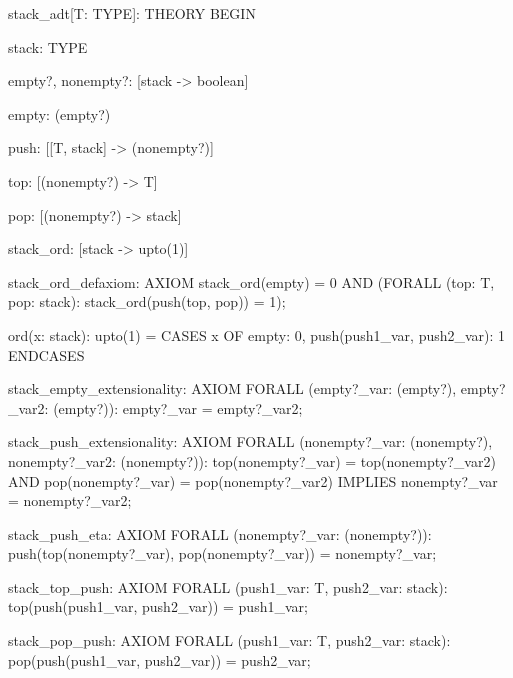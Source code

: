 stack_adt[T: TYPE]: THEORY
 BEGIN

  stack: TYPE

  empty?, nonempty?: [stack -> boolean]

  empty: (empty?)

  push: [[T, stack] -> (nonempty?)]

  top: [(nonempty?) -> T]

  pop: [(nonempty?) -> stack]

  stack_ord: [stack -> upto(1)]

  stack_ord_defaxiom: AXIOM
    stack_ord(empty) = 0 AND
     (FORALL (top: T, pop: stack): stack_ord(push(top, pop)) = 1);

  ord(x: stack): upto(1) =
      CASES x OF empty: 0, push(push1_var, push2_var): 1 ENDCASES

  stack_empty_extensionality: AXIOM
    FORALL (empty?_var: (empty?), empty?_var2: (empty?)):
      empty?_var = empty?_var2;

  stack_push_extensionality: AXIOM
    FORALL (nonempty?_var: (nonempty?), nonempty?_var2: (nonempty?)):
      top(nonempty?_var) = top(nonempty?_var2) AND
       pop(nonempty?_var) = pop(nonempty?_var2)
       IMPLIES nonempty?_var = nonempty?_var2;

  stack_push_eta: AXIOM
    FORALL (nonempty?_var: (nonempty?)):
      push(top(nonempty?_var), pop(nonempty?_var)) = nonempty?_var;

  stack_top_push: AXIOM
    FORALL (push1_var: T, push2_var: stack):
      top(push(push1_var, push2_var)) = push1_var;

  stack_pop_push: AXIOM
    FORALL (push1_var: T, push2_var: stack):
      pop(push(push1_var, push2_var)) = push2_var;
